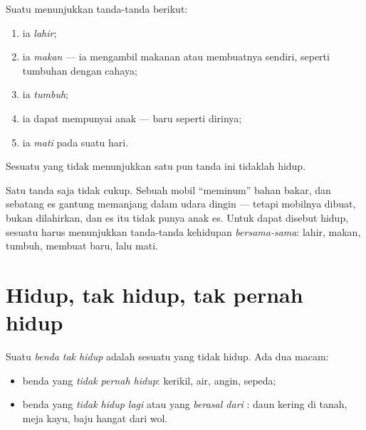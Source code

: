 \begin{proposition}\label{prop:g1:living-or-not:signs}
Suatu  menunjukkan tanda-tanda berikut:
\begin{enumerate}
  \item ia \emph{lahir};
  \item ia \emph{makan} --- ia mengambil makanan atau
        membuatnya sendiri, seperti tumbuhan dengan cahaya;
  \item ia \emph{tumbuh};
  \item ia dapat mempunyai anak ---  baru seperti dirinya;
  \item ia \emph{mati} pada suatu hari.
\end{enumerate}
Sesuatu yang tidak menunjukkan satu pun tanda ini tidaklah hidup.
\end{proposition}
\admitted

\begin{remark}\label{rem:g1:living-or-not:allsigns}
Satu tanda saja tidak cukup. Sebuah mobil ``meminum'' bahan bakar, dan
sebatang es gantung memanjang dalam udara dingin --- tetapi mobilnya
dibuat, bukan dilahirkan, dan es itu tidak punya anak es. Untuk dapat
disebut hidup, sesuatu harus menunjukkan tanda-tanda kehidupan
\emph{bersama-sama}: lahir, makan, tumbuh, membuat  baru,
lalu mati.
\end{remark}

\section{Hidup, tak hidup, tak pernah hidup}

\begin{definition}\label{def:g1:living-or-not:nonliving}
Suatu \emph{benda tak hidup} adalah sesuatu
yang tidak hidup. Ada dua macam:
\begin{itemize}
  \item benda yang \emph{tidak pernah hidup}:
        kerikil, air, angin, sepeda;
  \item benda yang \emph{tidak hidup lagi}
atau yang \emph{berasal dari} : daun kering
        di tanah, meja kayu, baju hangat dari wol.
\end{itemize}
\end{definition}

